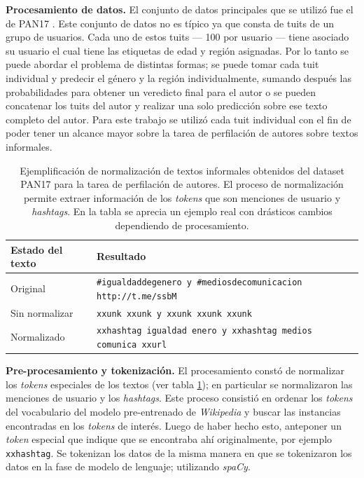 \textbf{Procesamiento de datos.} El conjunto de datos principales que se utilizó fue el de PAN17 \parencite{rangel2017overview}. Este conjunto de datos no es típico ya que consta de tuits de un grupo de usuarios. Cada uno de estos tuits --- 100 por usuario --- tiene asociado su usuario el cual tiene las etiquetas de edad y región asignadas. Por lo tanto se puede abordar el problema de distintas formas; se puede tomar cada tuit individual y predecir el género y la región individualmente, sumando después las probabilidades para obtener un veredicto final para el autor o se pueden concatenar los tuits del autor y realizar una solo predicción sobre ese texto completo del autor. Para este trabajo se utilizó cada tuit individual con el fin de poder tener un alcance mayor sobre la tarea de perfilación de autores sobre textos informales.

\begin{table}
\centering
{}
\begin{tabular}{| p{3cm} | p{9.5cm} |}
\hline
\textbf{Estado del texto} & \textbf{Resultado} \\
\hline
Original & \texttt{\#igualdaddegenero y \#mediosdecomunicacion http://t.me/ssbM} \\
Sin normalizar & \texttt{xxunk xxunk y xxunk xxunk xxunk} \\
Normalizado & \texttt{xxhashtag igualdad enero y xxhashtag medios comunica xxurl} \\
\hline
\end{tabular}
\caption{Ejemplificación de normalización de textos informales obtenidos del dataset PAN17 para la tarea de perfilación de autores. El proceso de normalización permite extraer información de los \textit{tokens} que son menciones de usuario y \textit{hashtags}. En la tabla se aprecia un ejemplo real con drásticos cambios dependiendo de procesamiento.}
\label{tab:pan17preproc}
\end{table}

\textbf{Pre-procesamiento y tokenización.} El procesamiento constó de normalizar los \textit{tokens} especiales de los textos (ver tabla \ref{tab:pan17preproc}); en particular se normalizaron las menciones de usuario y los \textit{hashtags}. Este proceso consistió en ordenar los \textit{tokens} del vocabulario del modelo pre-entrenado de \textit{Wikipedia} y buscar las instancias encontradas en los \textit{tokens} de interés. Luego de haber hecho esto, anteponer un \textit{token} especial que indique que se encontraba ahí originalmente, por ejemplo \texttt{xxhashtag}. Se tokenizan los datos de la misma manera en que se tokenizaron los datos en la fase de modelo de lenguaje; utilizando \textit{spaCy}.

